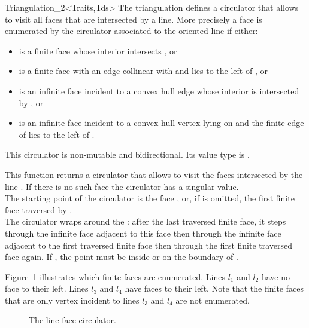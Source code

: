 \begin{ccRefClass}{Triangulation_2<Traits,Tds>}
The triangulation defines a circulator that allows
to visit all faces that are intersected by a line. 
More precisely a face   is enumerated by the circulator 
associated to the oriented line  if either:
\begin{itemize}\ccTexHtml{\itemsep0pt}{}
\item 
{} is a finite face whose interior intersects , or
\item
  is a finite face with  an edge collinear with  and lies
to the left of , or
\item
{} is an infinite face incident to a  convex hull edge 
whose interior is intersected
by , or
\item
{} is an infinite face incident to a  convex hull vertex
lying on   and the finite edge of 
lies to the left of . 
\end{itemize}
This circulator is
non-mutable and bidirectional. Its value type is .

{ This function returns a circulator that allows to visit the 
 faces intersected by the line . 
If there is no such face the circulator has a singular value.\\
 The starting point of the circulator is the face , or, if
  is omitted,  the first finite face traversed by . \\
  The circulator wraps around the  :
after the last traversed finite face, it steps through the infinite face adjacent
to this face then through the infinite face adjacent to the first
traversed finite face then through the first finite traversed face again.
\ccPrecond If , the point  must be
inside or on the boundary of .}

Figure~\ref{Triangulation_ref_Fig_Line_face_circulator} illustrates which finite faces are enumerated. Lines
$l_1$ and $l_2$ have no face to their left. Lines $l_3$ and $l_4$
have faces to their left. Note that the finite faces that are only vertex
incident to lines $l_3$ and  $l_4$ are not enumerated.

\begin{figure}
\begin{ccTexOnly}
\begin{center}   \end{center}
\end{ccTexOnly} 
\caption{The line face circulator.
\label{Triangulation_ref_Fig_Line_face_circulator}}


\end{figure}
\end{ccRefClass}
